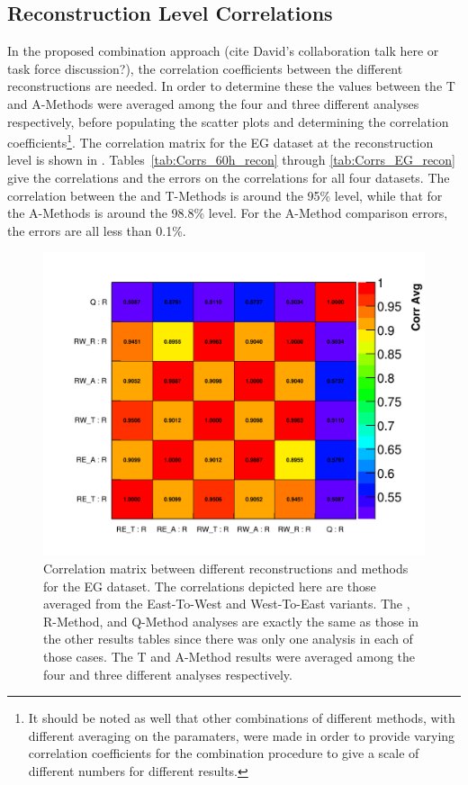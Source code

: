 \subsection{Reconstruction Level Correlations}
\label{sub:reconcorrelations}

In the proposed combination approach (cite David's collaboration talk here or task force discussion?), the correlation coefficients between the different reconstructions are needed. In order to determine these the \R values between the \RW T and A-Methods were averaged among the four and three different analyses respectively, before populating the scatter plots and determining the correlation coefficients\footnote{It should be noted as well that other combinations of different methods, with different averaging on the \R paramaters, were made in order to provide varying correlation coefficients for the combination procedure to give a scale of different numbers for different results.}. The correlation matrix for the EG dataset at the reconstruction level is shown in . Tables~\ref{tab:Corrs_60h_recon} through \ref{tab:Corrs_EG_recon} give the correlations and the errors on the correlations for all four datasets. The correlation between the \RE and \RW T-Methods is around the 95\% level, while that for the A-Methods is around the 98.8\% level. For the A-Method comparison errors, the errors are all less than 0.1\%.



\begin{figure}[]
\centering
\includegraphics[width=\textwidth]{Avg_Recon_CorrelationMatrix_R_R}
\caption{Correlation matrix between different reconstructions and methods for the EG dataset. The correlations depicted here are those averaged from the East-To-West and West-To-East variants. The \RE, R-Method, and Q-Method analyses are exactly the same as those in the other results tables since there was only one analysis in each of those cases. The \RW T and A-Method results were averaged among the four and three different analyses respectively.}
\label{fig:corrMatRecon}
\end{figure}



